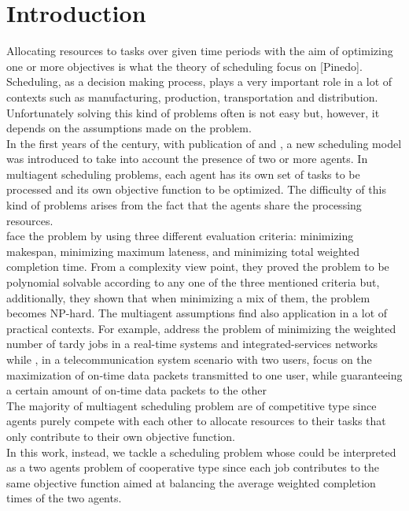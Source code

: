 \documentclass[opre,nonblindrev]{informs3} %
\begin{document}
\section{Introduction}
Allocating resources to tasks over given time periods with the aim of optimizing one or more objectives is what the theory of scheduling focus on [Pinedo]. Scheduling, as a decision making process, plays a very important role in a lot of contexts such as manufacturing, production, transportation and distribution. Unfortunately solving this kind of problems often is not easy but, however, it depends on the assumptions made on the problem.\\
In the first years of the century, with publication of \cite{agnetis04} and \cite{baker2003}, a new scheduling model was introduced to take into account the presence of two or more agents. In multiagent scheduling problems, each agent has its own set of tasks to be processed and its own objective function to be optimized. The difficulty of this kind of problems arises from the fact that the agents share the processing resources.\\
\cite{baker2003} face the problem by using three different evaluation criteria: minimizing makespan, minimizing maximum lateness, and minimizing total weighted completion time. From a complexity view point, they proved the problem to be polynomial solvable according to any one of the three mentioned criteria but, additionally, they shown that when minimizing a mix of them, the problem becomes NP-hard. 
The multiagent assumptions find also application in a lot of practical contexts. For example, \cite{Peha95} address the problem of minimizing the weighted number of tardy jobs in a real-time systems and integrated-services networks while \cite{Arbib04}, in a  telecommunication system scenario with two users, focus on the maximization of on‐time data packets transmitted to one user, while guaranteeing a certain amount of on‐time data packets to the other\\
 The majority of multiagent scheduling problem are of competitive type since agents purely compete with each other to allocate resources to their tasks that only contribute to their own objective function.\\ In this work, instead, we tackle a scheduling problem whose could be interpreted as a two agents problem of cooperative type since each job contributes to the same objective function aimed at balancing the average weighted completion times of the two agents.\\
\end{document}
